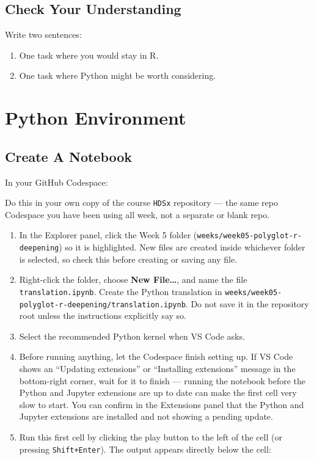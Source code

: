 \documentclass[
  letterpaper,
  DIV=11,
  numbers=noendperiod,
  oneside]{scrreprt}
\providecommand{\tightlist}{%
  \setlength{\itemsep}{0pt}\setlength{\parskip}{0pt}}
\begin{document}
\section{Check Your Understanding}\label{check-your-understanding}

Write two sentences:

\begin{enumerate}
\def\labelenumi{\arabic{enumi}.}
\tightlist
\item
  One task where you would stay in R.
\item
  One task where Python might be worth considering.
\end{enumerate}

\chapter{Python Environment}\label{python-environment}

\section{Create A Notebook}\label{create-a-notebook}

In your GitHub Codespace:

Do this in your own copy of the course \texttt{HDSx} repository --- the
same repo Codespace you have been using all week, not a separate or
blank repo.

\begin{enumerate}
\def\labelenumi{\arabic{enumi}.}
\tightlist
\item
  In the Explorer panel, click the Week 5 folder
  (\texttt{weeks/week05-polyglot-r-deepening}) so it is highlighted. New
  files are created inside whichever folder is selected, so check this
  before creating or saving any file.
\item
  Right-click the folder, choose \textbf{New File\ldots{}}, and name the
  file \texttt{translation.ipynb}. Create the Python translation in
  \texttt{weeks/week05-polyglot-r-deepening/translation.ipynb}. Do not
  save it in the repository root unless the instructions explicitly say
  so.
\item
  Select the recommended Python kernel when VS Code asks.
\item
  Before running anything, let the Codespace finish setting up. If VS
  Code shows an ``Updating extensions'' or ``Installing extensions''
  message in the bottom-right corner, wait for it to finish --- running
  the notebook before the Python and Jupyter extensions are up to date
  can make the first cell very slow to start. You can confirm in the
  Extensions panel that the Python and Jupyter extensions are installed
  and not showing a pending update.
\item
  Run this first cell by clicking the play button to the left of the
  cell (or pressing \texttt{Shift+Enter}). The output appears directly
  below the cell:
\end{enumerate}
\end{document}
